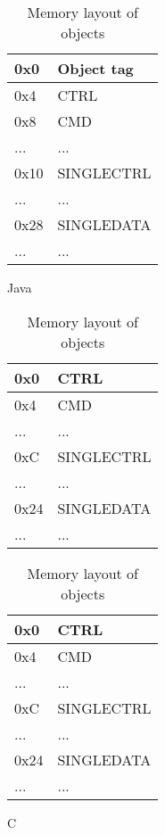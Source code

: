 \begin{table}[H]

  \centering
  \begin{subfigure}{0.31\textwidth}
    \begin{tabular}{|l|l|}
      \hline
      0x0&Object tag \\ \hline
      0x4&CTRL       \\ \hline
      0x8&CMD        \\ \hline
      ...&...        \\ \hline
      0x10&SINGLECTRL\\ \hline
      ...&...        \\ \hline
      0x28&SINGLEDATA\\ \hline
      ...&...        \\ \hline
    \end{tabular}
    \caption{Java}
    \label{fig:back:memlayout:java}
  \end{subfigure}
  \hfill
  \begin{subfigure}{0.31\textwidth}
    \begin{tabular}{|l|l|}
      \hline
      0x0&CTRL       \\ \hline
      0x4&CMD        \\ \hline
      ...&...        \\ \hline
      0xC&SINGLECTRL \\ \hline
      ...&...        \\ \hline
      0x24&SINGLEDATA\\ \hline
      ...&...        \\ \hline
    \end{tabular}
    \caption{\rust}
    \label{fig:back:memlayout:rust}
  \end{subfigure}
  \hfill
  \begin{subfigure}{0.31\textwidth}
    \begin{tabular}{|l|l|}
      \hline
      0x0&CTRL       \\ \hline
      0x4&CMD        \\ \hline
      ...&...        \\ \hline
      0xC&SINGLECTRL \\ \hline
      ...&...        \\ \hline
      0x24&SINGLEDATA\\ \hline
      ...&...        \\ \hline
    \end{tabular}
        \caption{C}
    \label{fig:back:memlayout:c}
  \end{subfigure}
  \caption{Memory layout of objects}
  \label{fig:back:memlayout}

\end{table}

